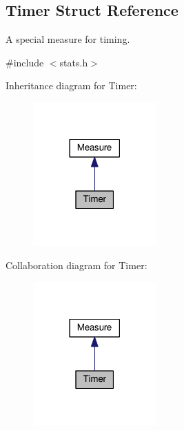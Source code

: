 \hypertarget{structTimer}{}\subsection{Timer Struct Reference}
\label{structTimer}


A special measure for timing.  




{\ttfamily \#include $<$stats.\+h$>$}



Inheritance diagram for Timer\+:\nopagebreak
\begin{figure}[H]
\begin{center}
\leavevmode
\includegraphics[width=134pt]{structTimer__inherit__graph}
\end{center}
\end{figure}


Collaboration diagram for Timer\+:\nopagebreak
\begin{figure}[H]
\begin{center}
\leavevmode
\includegraphics[width=134pt]{structTimer__coll__graph}
\end{center}
\end{figure}
